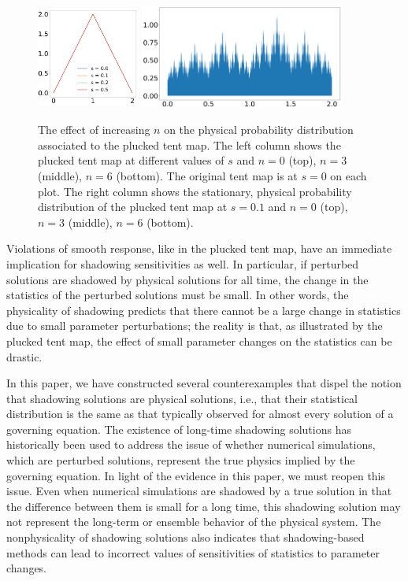 \begin{figure}
    \includegraphics[width=0.3\textwidth,height=1.35in]{osc_tent_6.png}
     \includegraphics[width=0.6\textwidth,height=1.35in]{osc_tent_dens_0.1_6.png}
    \caption{
    The effect of increasing $n$ on the physical probability distribution associated to the plucked tent map. The left column shows the plucked tent map at 
    different values of $s$ and $n = 0$ (top), $n=3$ (middle), $n=6$ (bottom). The original tent map is at $s=0$ on each plot.
    The right column shows the stationary, physical probability distribution of the plucked tent map at $s=0.1$ and $n = 0$ (top), $n=3$ (middle), $n = 6$ (bottom).}
    \label{fig:pluckedTentMap}
\end{figure}


Violations of smooth response, like in the plucked tent map, have an immediate implication for shadowing sensitivities as well. In particular, if perturbed solutions are shadowed by physical solutions for all time, the change in the statistics of the perturbed solutions must be small. In other words, the physicality of shadowing predicts that there cannot be a large change in statistics due to small parameter perturbations; the reality is that, as illustrated by the plucked tent map, the effect of small parameter changes on the statistics can be drastic.  


In this paper, we have constructed several counterexamples that 
dispel the notion that shadowing solutions are physical solutions, i.e., that their 
statistical distribution is the same as that typically observed for almost every solution 
of a governing equation. The existence of long-time shadowing solutions \cite{grebogi} has historically been used to address the issue of whether numerical simulations, which are 
perturbed solutions, represent the true physics implied by the governing equation. In light of the evidence in this paper, we must reopen this issue. Even when numerical simulations are 
shadowed by a true solution in that the difference between them is small for a long time, this shadowing solution may not represent the long-term or ensemble behavior of the physical system. The nonphysicality of shadowing solutions also indicates that shadowing-based methods can lead to incorrect values of sensitivities of statistics to parameter changes. 

